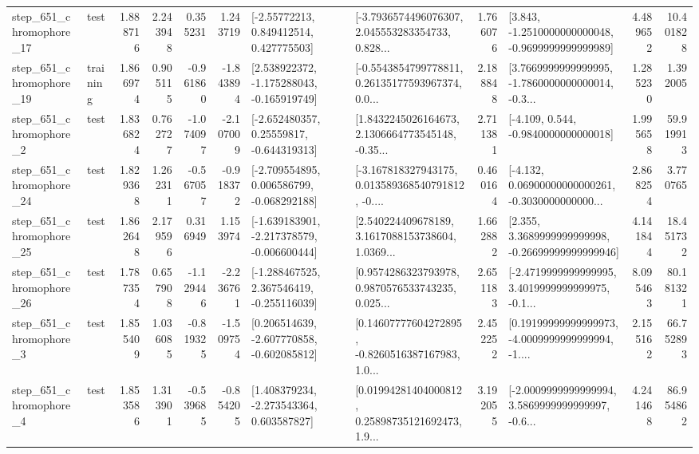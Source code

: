 \begin{tabular}{llrrrrllrlrr}
  step\_651\_chromophore\_17 &      test &      1.888716 &    2.243948 &      0.355231 &  1.243719 &     [-2.55772213, 0.849412514, 0.427775503] &  [-3.7936574496076307, 2.045553283354733, 0.828... &       1.766076 &  [3.843, -1.2510000000000048, -0.9699999999999989] &            4.489652 &         10.401828 \\
  step\_651\_chromophore\_19 &  training &      1.866974 &    0.905115 &     -0.961860 & -1.843894 &   [2.538922372, -1.175288043, -0.165919749] &  [-0.5543854799778811, 0.26135177593967374, 0.0... &       2.188848 &  [3.7669999999999995, -1.7860000000000014, -0.3... &            1.285230 &          1.392005 \\
   step\_651\_chromophore\_2 &      test &      1.836824 &    0.762727 &     -1.074097 & -2.107009 &    [-2.652480357, 0.25559817, -0.644319313] &  [1.8432245026164673, 2.1306664773545148, -0.35... &       2.711381 &               [-4.109, 0.544, -0.9840000000000018] &            1.995658 &         59.919913 \\
  step\_651\_chromophore\_24 &      test &      1.829368 &    1.262311 &     -0.567057 & -0.918372 &   [-2.709554895, 0.006586799, -0.068292188] &  [-3.167818327943175, 0.013589368540791812, -0.... &       0.460164 &  [-4.132, 0.06900000000000261, -0.3030000000000... &            2.868254 &          3.770765 \\
  step\_651\_chromophore\_25 &      test &      1.862648 &    2.179596 &      0.316949 &  1.153974 &  [-1.639183901, -2.217378579, -0.006600444] &  [2.540224409678189, 3.1617088153738604, 1.0369... &       1.662882 &  [2.355, 3.3689999999999998, -0.26699999999999946] &            4.141844 &         18.451732 \\
  step\_651\_chromophore\_26 &      test &      1.787354 &    0.657908 &     -1.129446 & -2.236761 &   [-1.288467525, 2.367546419, -0.255116039] &  [0.9574286323793978, 0.9870576533743235, 0.025... &       2.651183 &  [-2.4719999999999995, 3.4019999999999975, -0.1... &            8.095463 &         80.181321 \\
   step\_651\_chromophore\_3 &      test &      1.855409 &    1.036085 &     -0.819325 & -1.509754 &   [0.206514639, -2.607770858, -0.602085812] &  [0.14607777604272895, -0.8260516387167983, 1.0... &       2.452252 &  [0.19199999999999973, -4.0009999999999994, -1.... &            2.155162 &         66.752893 \\
   step\_651\_chromophore\_4 &      test &      1.853586 &    1.313901 &     -0.539685 & -0.854205 &    [1.408379234, -2.273543364, 0.603587827] &  [0.01994281404000812, 0.25898735121692473, 1.9... &       3.192055 &  [-2.0009999999999994, 3.5869999999999997, -0.6... &            4.241468 &         86.954862 \\

\end{tabular}
